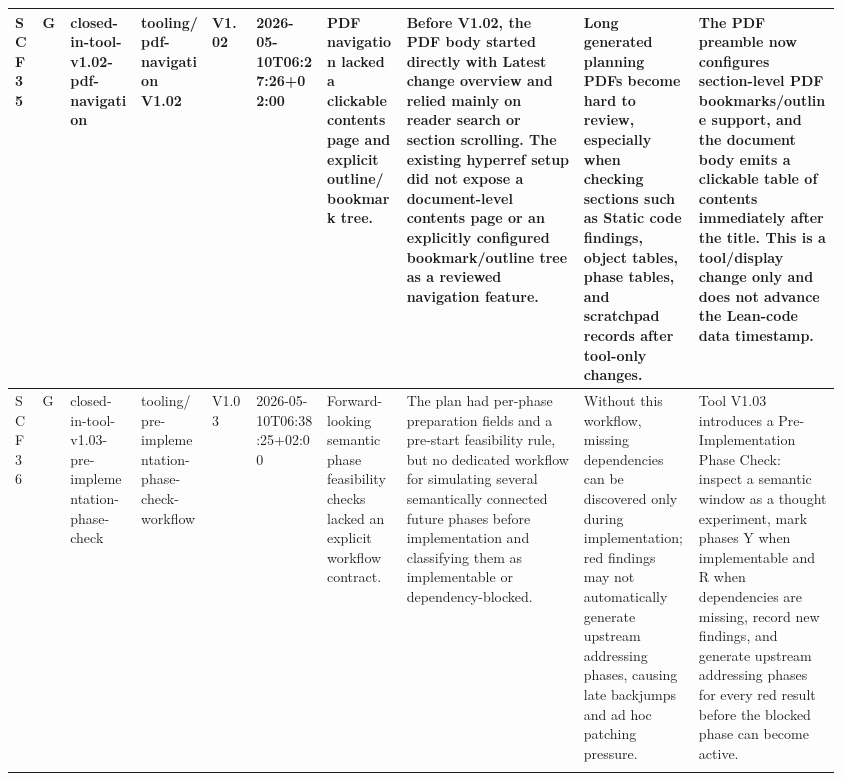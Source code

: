\begin{longtable}{L{0.03\linewidth} L{0.026\linewidth} L{0.087\linewidth} L{0.085\linewidth} L{0.052\linewidth} L{0.085\linewidth} L{0.095\linewidth} L{0.205\linewidth} L{0.13\linewidth} L{0.165\linewidth}}
\hline
\addlinespace[0.24em]
SCF35 & G & closed-in-tool-v1.02-pdf-navigation & tooling/\allowbreak{}pdf-navigation V1.02 & V1.02 & 2026-05-10T06:27:26+02:00 & PDF navigation lacked a clickable contents page and explicit outline/\allowbreak{}bookmark tree. & Before V1.02, the PDF body started directly with Latest change overview and relied mainly on reader search or section scrolling. The existing hyperref setup did not expose a document-level contents page or an explicitly configured bookmark/\allowbreak{}outline tree as a reviewed navigation feature. & Long generated planning PDFs become hard to review, especially when checking sections such as Static code findings, object tables, phase tables, and scratchpad records after tool-only changes. & The PDF preamble now configures section-level PDF bookmarks/\allowbreak{}outline support, and the document body emits a clickable table of contents immediately after the title. This is a tool/\allowbreak{}display change only and does not advance the Lean-code data timestamp.\\
\hline
\addlinespace[0.24em]
SCF36 & G & closed-in-tool-v1.03-pre-implementation-phase-check & tooling/\allowbreak{}pre-implementation-phase-check-workflow & V1.03 & 2026-05-10T06:38:25+02:00 & Forward-looking semantic phase feasibility checks lacked an explicit workflow contract. & The plan had per-phase preparation fields and a pre-start feasibility rule, but no dedicated workflow for simulating several semantically connected future phases before implementation and classifying them as implementable or dependency-blocked. & Without this workflow, missing dependencies can be discovered only during implementation;\newline red findings may not automatically generate upstream addressing phases, causing late backjumps and ad hoc patching pressure. & Tool V1.03 introduces a Pre-Implementation Phase Check: inspect a semantic window as a thought experiment, mark phases Y when implementable and R when dependencies are missing, record new findings, and generate upstream addressing phases for every red result before the blocked phase can become active.\\
\hline
\addlinespace[0.24em]

\end{longtable}
